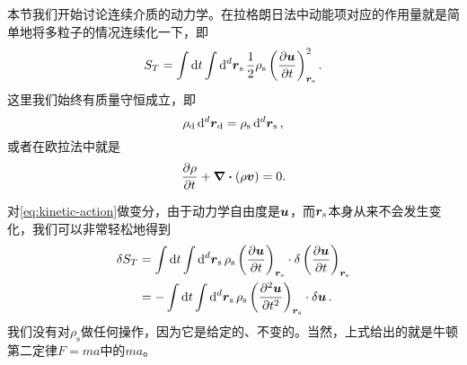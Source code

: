 \documentclass[hyperref, UTF8, a4paper]{ctexart}
\begin{document}
本节我们开始讨论连续介质的动力学。在拉格朗日法中动能项对应的作用量就是简单地将多粒子的情况连续化一下，即
\begin{equation}
    S_T = \int \dd{t} \int \dd[d]{\vb*{r}_\text{s}} \frac{1}{2} \rho_\text{s} \left( \pdv{\vb*{u}}{t} \right)_{\vb*{r}_\text{s}}^2.
    \label{eq:kinetic-action}
\end{equation}
这里我们始终有质量守恒成立，即
\begin{equation}
    \rho_\text{d} \dd[d]{\vb*{r}_\text{d}} = \rho_\text{s} \dd[d]{\vb*{r}_\text{s}},
    \label{eq:density-eq}
\end{equation}
或者在欧拉法中就是
\begin{equation}
    \pdv{\rho}{t} + \div{(\rho \vb*{v})} = 0.
    \label{eq:mass-conservation}
\end{equation}

对\eqref{eq:kinetic-action}做变分，由于动力学自由度是$\vb*{u}$，而$\vb*{r}_\text{s}$本身从来不会发生变化，我们可以非常轻松地得到
\begin{equation}
    \begin{aligned}
        \var{S_T} &= \int \dd{t} \int \dd[d]{\vb*{r}_\text{s}}  \rho_\text{s} \left( \pdv{\vb*{u}}{t} \right)_{\vb*{r}_\text{s}} \cdot \var{\left( \pdv{\vb*{u}}{t} \right)_{\vb*{r}_\text{s}}} \\
        &= - \int \dd{t} \int \dd[d]{\vb*{r}_\text{s}}  \rho_\text{s} \left( \pdv[2]{\vb*{u}}{t} \right)_{\vb*{r}_\text{s}} \cdot \var{\vb*{u}}.
    \end{aligned}
\end{equation}
我们没有对$\rho_\text{s}$做任何操作，因为它是给定的、不变的。当然，上式给出的就是牛顿第二定律$F=ma$中的$ma$。
\end{document}
